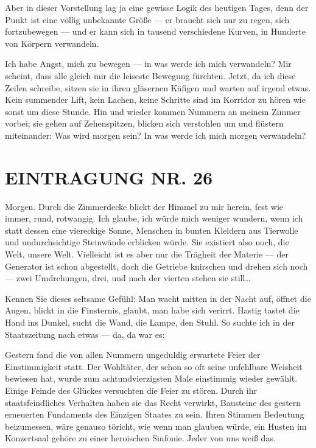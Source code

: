 Aber in dieser Vorstellung lag ja
eine gewisse Logik des heutigen Tages, denn der Punkt ist eine
völlig unbekannte Größe — er braucht sich nur zu regen, sich
fortzubewegen — und er kann sich in tausend verschiedene Kurven, in
Hunderte von Körpern verwandeln.

Ich habe Angst, mich zu bewegen —
in was werde ich mich verwandeln? Mir scheint, dass alle gleich mir
die leiseste Bewegung fürchten. Jetzt, da ich diese Zeilen
schreibe, sitzen sie in ihren gläsernen Käfigen und warten auf
irgend etwas. Kein summender Lift, kein Lachen, keine Schritte sind
im Korridor zu hören wie sonst um diese Stunde. Hin und wieder
kommen Nummern an meinem Zimmer vorbei; sie gehen auf Zehenspitzen,
blicken sich verstohlen um und flüstern miteinander: Was wird
morgen sein? In was werde ich mich morgen verwandeln?

\section{EINTRAGUNG NR. 26}

Morgen. Durch die Zimmerdecke blickt der Himmel zu mir herein, fest
wie immer, rund, rotwangig. Ich glaube, ich würde mich weniger
wundern, wenn ich statt dessen eine viereckige Sonne, Menschen in
bunten Kleidern aus Tierwolle und undurchsichtige Steinwände
erblicken würde. Sie existiert also noch, die Welt, unsere Welt.
Vielleicht ist es aber nur die Trägheit der Materie — der Generator
ist schon abgestellt, doch die Getriebe knirschen und drehen sich
noch — zwei Umdrehungen, drei, und nach der vierten stehen sie
still\ldots{}

Kennen Sie dieses seltsame Gefühl: Man wacht mitten in der Nacht
auf, öffnet die Augen, blickt in die Finsternis, glaubt, man habe
sich verirrt. Hastig tastet die Hand ins Dunkel, sucht die Wand,
die Lampe, den Stuhl. So suchte ich in der Staatszeitung nach etwas
— da, da war es:
\begin{meldung}
Gestern fand die von allen Nummern ungeduldig
erwartete Feier der Einstimmigkeit statt. Der Wohltäter, der schon
so oft seine unfehlbare Weisheit bewiesen hat, wurde zum
achtundvierzigsten Male einstimmig wieder gewählt. Einige Feinde
des Glückes versuchten die Feier zu stören. Durch ihr
staatsfeindliches Verhalten haben sie das Recht verwirkt, Bausteine
des gestern erneuerten Fundaments des Einzigen Staates zu sein.
Ihren Stimmen Bedeutung beizumessen, wäre genauso töricht, wie wenn
man glauben würde, ein Husten im Konzertsaal gehöre zu einer
heroischen Sinfonie. Jeder von uns weiß das.
\end{meldung}


